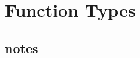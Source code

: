 \documentclass[DaoFP]{subfiles}
\begin{document}
\setcounter{chapter}{5}

\chapter{Function Types}

\section{notes}



\begin{exercise}
\end{exercise}
\begin{haskell}
\end{haskell}
\end{document}
